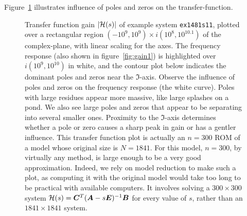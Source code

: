 Figure~\ref{fig:full1841s11} illustrates influence of poles and zeros on the transfer-function.


\begin{figure}[htb]
\centering
{}
\caption{\label{fig:full1841s11}Transfer function gain  $\vert \mathcal{H}(s) \vert$ of example system \texttt{ex1481s11}, plotted over a rectangular region $(-10^{9}, 10^{9}) \times i(10^{8}, 10^{10.1}) $ of the complex-plane, with linear scaling for the axes. The frequency response (also shown in figure~\ref{fig:gain1}) is highlighted over $i(10^9, 10^{10})$ in white, and the contour plot below indicates the dominant poles and zeros near the $\Im$-axis.   Observe the influence of poles and zeros on the frequency response (the white curve).  Poles with large residues appear more massive, like large splashes on a pond.  We also see large poles and zeros that appear to be separating into several smaller ones. Proximity to the $\Im$-axis determines whether a pole or zero causes a sharp peak in gain or has a gentler influence.  
This transfer function plot is actually an $n=300$ ROM of a model whose original size is $N=1841$. For this model, $n=300$, by virtually any method, is large enough to be a very good approximation.  Indeed, we rely on model reduction to make such a plot, as computing it with the original model would take too long to be practical with available computers.  It involves solving a $300 \times 300$ system $\mathcal{H}(s)=\bm{C}^T(\bm{A}-s\bm{E})^{-1}\bm{B}$ for every value of $s$, rather than an $1841 \times 1841$ system.}  
\end{figure}



